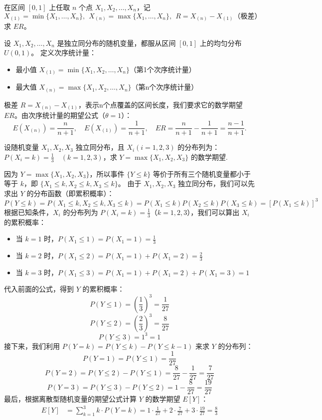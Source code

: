 ﻿\documentclass[lang=cn,11pt]{elegantbook}
\begin{document}
\begin{exercise}\label{exer:4-range}
在区间 \([0,1]\) 上任取 \(n\) 个点 \(X_1, X_2, \dots, X_n\)，记 \[X_{(1)} = \min\{X_1, \dots, X_n\},~~X_{(n)} = \max\{X_1, \dots, X_n\},~~R = X_{(n)} - X_{(1)}\text{（极差）}\]求 \(ER\)。
\end{exercise}
\begin{solution}
设 \( X_1,X_2,\dots,X_n \) 是独立同分布的随机变量，都服从区间 \([0,1]\) 上的均匀分布 \( U(0,1) \)。 定义次序统计量：
\begin{itemize}
    \item 最小值 \( X_{(1)} = \min\{X_1,X_2,\dots,X_n\} \)（第1个次序统计量）
    \item 最大值 \( X_{(n)} = \max\{X_1,X_2,\dots,X_n\} \)（第n个次序统计量）
\end{itemize}
极差 \( R = X_{(n)} - X_{(1)} \)，表示n个点覆盖的区间长度，我们要求它的数学期望 \( ER \)。由次序统计量的期望公式（\(\theta = 1\)）：
\[
E(X_{(n)}) = \frac{n}{n+1},\quad E(X_{(1)}) = \frac{1}{n+1},\quad ER = \frac{n}{n+1} - \frac{1}{n+1} = \frac{n-1}{n+1}.
\]
\end{solution}



\begin{exercise}
设随机变量 $X_1, X_2, X_3$ 独立同分布，且 $X_i (i=1,2,3)$ 的分布列为：$P(X_i = k) = \frac{1}{3} \quad (k=1,2,3)$，求 $Y = \max\{X_1, X_2, X_3\}$ 的数学期望.
\end{exercise}
\begin{solution}
因为 $Y = \max\{X_1, X_2, X_3\}$，所以事件 $\{Y \le k\}$ 等价于所有三个随机变量都小于等于 $k$，即 $\{X_1 \le k, X_2 \le k, X_3 \le k\}$。
由于 $X_1, X_2, X_3$ 独立同分布，我们可以先求出 $Y$ 的分布函数（即累积概率）：
$$P(Y \le k) = P(X_1 \le k, X_2 \le k, X_3 \le k) = P(X_1 \le k)P(X_2 \le k)P(X_3 \le k) = [P(X_1 \le k)]^3$$
根据已知条件，$X_i$ 的分布列为 $P(X_i = k) = \frac{1}{3}$（$k=1,2,3$），我们可以算出 $X_i$ 的累积概率：
\begin{itemize}
\item 当 $k=1$ 时，$P(X_1 \le 1) = P(X_1 = 1) = \frac{1}{3}$
\item 当 $k=2$ 时，$P(X_1 \le 2) = P(X_1 = 1) + P(X_1 = 2) = \frac{2}{3}$
\item 当 $k=3$ 时，$P(X_1 \le 3) = P(X_1 = 1) + P(X_1 = 2) + P(X_1 = 3) = 1$
\end{itemize}
代入前面的公式，得到 $Y$ 的累积概率：
$$P(Y \le 1) = \left(\frac{1}{3}\right)^3 = \frac{1}{27}$$
$$P(Y \le 2) = \left(\frac{2}{3}\right)^3 = \frac{8}{27}$$
$$P(Y \le 3) = 1^3 = 1$$
接下来，我们利用 $P(Y = k) = P(Y \le k) - P(Y \le k-1)$ 来求 $Y$ 的分布列：
$$P(Y = 1) = P(Y \le 1) = \frac{1}{27}$$
$$P(Y = 2) = P(Y \le 2) - P(Y \le 1) = \frac{8}{27} - \frac{1}{27} = \frac{7}{27}$$
$$P(Y = 3) = P(Y \le 3) - P(Y \le 2) = 1 - \frac{8}{27} = \frac{19}{27}$$
最后，根据离散型随机变量的期望公式计算 $Y$ 的数学期望 $E[Y]$：
\begin{align*}
E[Y] &= \sum_{k=1}^{3} k \cdot P(Y = k) = 1 \cdot \frac{1}{27} + 2 \cdot \frac{7}{27} + 3 \cdot \frac{19}{27} = \frac{8}{3}
\end{align*}
\end{solution}
\end{document}
